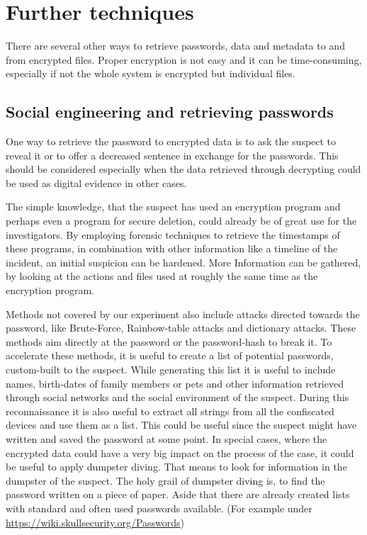 \section{Further techniques}
There are several other ways to retrieve passwords, data and metadata to and from encrypted files. Proper encryption is not easy and it can be time-consuming, especially if not the whole system is encrypted but individual files.
\subsection{Social engineering and retrieving passwords}
One way to retrieve the password to encrypted data is to ask the suspect to reveal it or to offer a decreased sentence in exchange for the passwords.
This should be considered especially when the data retrieved through decrypting could be used as digital evidence in other cases.

The simple knowledge, that the suspect has used an encryption program and perhaps even a program for secure deletion, could already be of great use for the investigators. By employing forensic techniques to retrieve the timestamps of these programs, in combination with other information like a timeline of the incident, an initial suspicion can be hardened. More Information can be gathered, by looking at the actions and files used at roughly the same time as the encryption program.

Methods not covered by our experiment also include attacks directed towards the password, like Brute-Force, Rainbow-table attacks and dictionary attacks. These methods aim directly at the password or the password-hash to break it. To accelerate these methods, it is useful to create a list of potential passwords, custom-built to the suspect. While generating this list it is useful to include names, birth-dates of family members or pets and other information retrieved through social networks and the social environment of the suspect. During this reconnaissance it is also useful to extract all strings from all the confiscated devices and use them as a list. This could be useful since the suspect might have written and saved the password at some point. In special cases, where the encrypted data could have a very big impact on the process of the case, it could be useful to apply dumpster diving.  That means to look for information in the dumpster of the suspect. The holy grail of dumpster diving is, to find the password written on a piece of paper.  Aside that there are already created lists with standard and often used passwords available.
(For example under \url{https://wiki.skullsecurity.org/Passwords})

